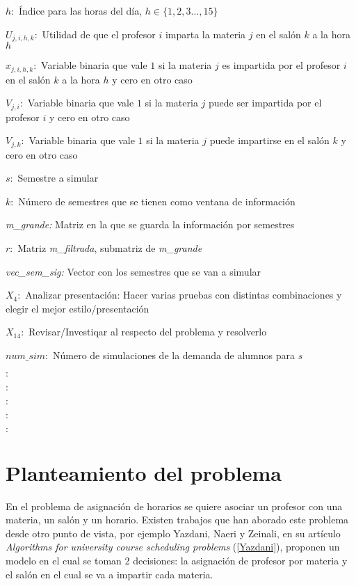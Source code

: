 $h:$ Índice para las horas del día, $h \in \{ 1, 2, 3 \ldots, 15\}$

$U_{j,i,h,k}:$ Utilidad de que el profesor $i$ imparta la materia $j$ en el salón $k$ a la hora $h$

$x_{j,i,h,k}:$ Variable binaria que vale $1$ si la materia $j$ es impartida por el profesor $i$ en el salón $k$ a la hora $h$ y cero en otro caso

$V_{j,i}:$ Variable binaria que vale $1$ si la materia $j$ puede ser impartida por  el profesor $i$ y cero en otro caso

$V_{j,k}:$ Variable binaria que vale $1$ si la materia $j$ puede impartirse en el salón $k$ y cero en otro caso

$s:$ Semestre a simular

$k:$ Número de semestres que se tienen como ventana de información

\textit{m\_grande:} Matriz en la que se guarda la información por semestres

$r:$ Matriz \textit{m\_filtrada}, submatriz de \textit{m\_grande}

\textit{vec\_sem\_sig:} Vector con los semestres que se van a simular

$X_{4}:$ Analizar presentación: Hacer varias pruebas con distintas combinaciones y elegir el mejor estilo/presentación

$X_{14}:$ Revisar/Investiqar al respecto del problema y resolverlo

$num\_sim:$ Número de simulaciones de la demanda de alumnos para $s$

$:$ 

$:$ 

$:$ 

$:$ 

$:$ 

\section{Planteamiento del problema}

En el problema de asignación de horarios se quiere asociar un profesor con una materia, un salón y un horario. Existen trabajos que han aborado este problema desde otro punto de vista, por ejemplo Yazdani, Naeri y Zeinali, en su artículo \textit{Algorithms for university course scheduling problems} (\ref{Yazdani}), proponen un modelo en el cual se toman 2 decisiones: la asignación de profesor por materia y el salón en el cual se va a impartir cada materia.

